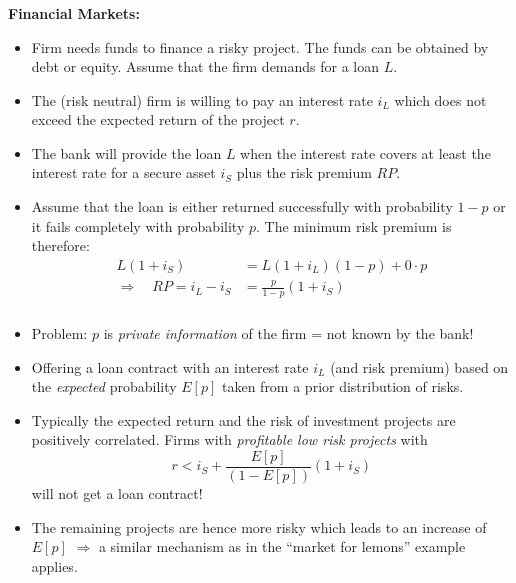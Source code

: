 \documentclass[11pt]{beamer}
\begin{document}
\begin{frame}
\frametitle{\insertsection}

\textbf{Financial Markets:}

\begin{itemize}
\item Firm needs funds to finance a risky project. The funds can be obtained by debt or equity. Assume that the firm demands for a loan $L$.

\item The (risk neutral) firm is willing to pay an interest rate $i_L$ which does not exceed the expected return of the project $r$.

\item The bank will provide the loan $L$ when the interest rate covers at least the interest rate for a secure asset $i_S$ plus the risk premium $RP$.

\item Assume that the loan is either returned successfully with probability $1-p$ or it fails completely with probability $p$. The minimum risk premium is therefore:
\begin{align}
L(1+i_S) &= L(1+i_L)(1-p)+0\cdot p\\
\Rightarrow\quad
RP=i_L-i_S &= \frac{p}{1-p}(1+i_S)
\end{align}

\end{itemize}

\end{frame}


\begin{frame}
\frametitle{\insertsection}

\begin{itemize}
\item Problem: $p$ is \textit{private information} of the firm = not known by the bank!

\item Offering a loan contract with an interest rate $i_L$ (and risk premium) based on the \textit{expected} probability $E[p]$ taken from a prior distribution of risks.

\item Typically the expected return and the risk of investment projects are positively correlated.
Firms with \textit{profitable low risk projects} with
$$
r<i_S+\frac{E[p]}{(1-E[p])}(1+i_S)
$$
will not get a loan contract!

\item The remaining projects are hence more risky which leads to an increase of $E[p]$ $\Rightarrow$ a similar mechanism as in the ``market for lemons'' example applies.
\end{itemize}

\end{frame}
\end{document}
